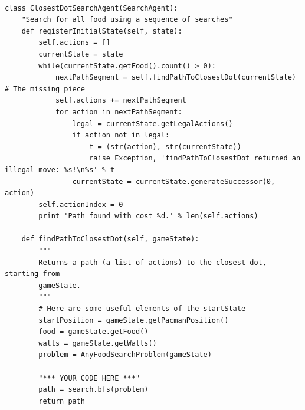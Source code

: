 \documentclass[forprint]{WHUBachelor}
\begin{document}
\begin{verbatim}

class ClosestDotSearchAgent(SearchAgent):
    "Search for all food using a sequence of searches"
    def registerInitialState(self, state):
        self.actions = []
        currentState = state
        while(currentState.getFood().count() > 0):
            nextPathSegment = self.findPathToClosestDot(currentState) # The missing piece
            self.actions += nextPathSegment
            for action in nextPathSegment:
                legal = currentState.getLegalActions()
                if action not in legal:
                    t = (str(action), str(currentState))
                    raise Exception, 'findPathToClosestDot returned an illegal move: %s!\n%s' % t
                currentState = currentState.generateSuccessor(0, action)
        self.actionIndex = 0
        print 'Path found with cost %d.' % len(self.actions)

    def findPathToClosestDot(self, gameState):
        """
        Returns a path (a list of actions) to the closest dot, starting from
        gameState.
        """
        # Here are some useful elements of the startState
        startPosition = gameState.getPacmanPosition()
        food = gameState.getFood()
        walls = gameState.getWalls()
        problem = AnyFoodSearchProblem(gameState)

        "*** YOUR CODE HERE ***"
        path = search.bfs(problem)
        return path

\end{verbatim}

\cleardoublepage
\end{document}
